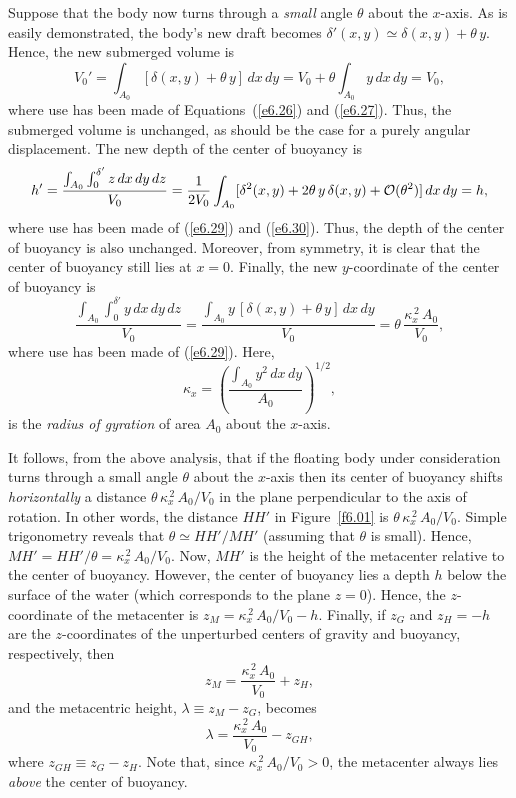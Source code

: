 Suppose that the body now turns  through a {\em small}\/ angle $\theta$ about the $x$-axis. 
As is easily demonstrated, the body's new draft becomes
$\delta'(x,y)\simeq \delta(x,y) + \theta\,y$. Hence, the new submerged volume is
\begin{equation}
V_0'=\int_{A_0} [\delta(x,y) + \theta\,y]\,dx\,dy = V_0 + \theta\int_{A_0} y\,dx\,dy = V_0,
\end{equation}
where use has been made of Equations~(\ref{e6.26}) and (\ref{e6.27}). Thus, the submerged volume is
unchanged, as should be the case for a purely angular displacement. The new depth of the center of buoyancy is
\begin{equation}
h' =  \frac{\int_{A_0}\int_0^{\delta'} z\,dx\,dy\,dz}{V_0}=\frac{1}{2V_0}\int_{A_0} [\delta^2(x,y) + 2\theta\,y\,\delta(x,y) + {\cal O}(\theta^2)]\,dx\,dy = h,
\end{equation}
where use has been made of (\ref{e6.29}) and (\ref{e6.30}). Thus, the depth of the center of buoyancy is also unchanged. Moreover, from symmetry, it
is clear that  the center of buoyancy still lies at $x=0$. Finally, the new $y$-coordinate of
the center of buoyancy is
\begin{equation}
 \frac{\int_{A_0}\int_0^{\delta'}y\,dx\,dy\,dz}{V_0}=\frac{\int_{A_0} y\,[\delta(x,y)+\theta\,y]\,dx\,dy}{V_0}=\theta\,\frac{\kappa_x^{\,2}\,A_0}{V_0},
\end{equation}
where use has been made of (\ref{e6.29}). Here,
\begin{equation}
\kappa_x = \left(\frac{\int_{A_0}y^2\,dx\,dy}{A_0}\right)^{1/2},
\end{equation}
is the {\em radius of gyration}\/ of area $A_0$ about the $x$-axis. 

It follows, from the above analysis, that if the floating body under consideration turns  through a
small angle $\theta$ about the $x$-axis then its center of buoyancy shifts {\em horizontally}\/  a distance $\theta\,\kappa_x^{\,2}\,A_0/V_0$ in the plane perpendicular to the axis of rotation.
In other words, the distance $HH'$ in Figure~\ref{f6.01} is $\theta\,\kappa_x^{\,2}\,A_0/V_0$. Simple trigonometry
reveals that $\theta \simeq HH'/MH'$ (assuming that $\theta$ is small). Hence, $MH' = HH'/\theta=\kappa_x^{\,2}\,A_0/V_0$. Now, $MH'$ is the height of the metacenter
relative to the center of buoyancy. However, the center of buoyancy lies a depth $h$ below the surface of the water (which corresponds to the plane $z=0$).
Hence, the $z$-coordinate of the metacenter  is $z_M=\kappa_x^{\,2}\,A_0/V_0- h$. Finally, if $z_G$ and $z_H=-h$ are the $z$-coordinates of the unperturbed
centers of gravity and  buoyancy, respectively,  then 
\begin{equation}
z_M = \frac{\kappa_x^{\,2}\,A_0}{V_0}+ z_H, 
\end{equation}
and
the metacentric height, $\lambda\equiv z_M-z_G$, becomes
\begin{equation}\label{e6.33}
\lambda = \frac{\kappa_x^{\,2}\,A_0}{V_0}-z_{GH},
\end{equation}
where $z_{GH} \equiv z_G-z_H$. Note that, since $\kappa_x^{\,2}\,A_0/V_0>0$, the metacenter always lies {\em above}\/
the center of buoyancy.

